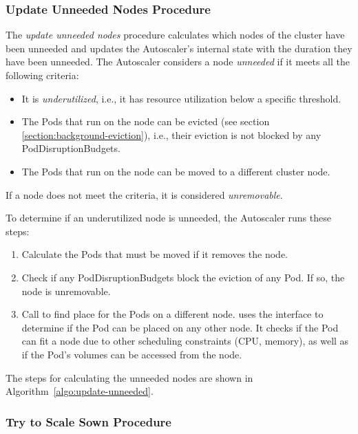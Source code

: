 \subsubsection{Update Unneeded Nodes Procedure}
The \textit{update unneeded nodes} procedure calculates which nodes of the
cluster have been unneeded and updates the Autoscaler's internal state with the
duration they have been unneeded. The Autoscaler considers a node
\textit{unneeded} if it meets all the following criteria:
\begin{itemize}
      \tightlist
      \item It is \textit{underutilized}, i.e., it has resource utilization
            below a specific threshold.
      \item The Pods that run on the node can be evicted (see section
            \ref{section:background-eviction}), i.e., their eviction is not
            blocked by any PodDisruptionBudgets.
      \item The Pods that run on the node can be moved to a different cluster
            node.
\end{itemize}
If a node does not meet the criteria, it is considered \textit{unremovable}.

To determine if an underutilized node is unneeded, the Autoscaler runs these
steps:
\begin{enumerate}
      \tightlist
      \item Calculate the Pods that must be moved if it removes the node.
      \item Check if any PodDisruptionBudgets block the eviction of any Pod. If
            so, the node is unremovable.
      \item Call  to find place for the Pods on a different
            node.  uses the
             interface to determine if the
            Pod can be placed on any other node. It checks if the Pod can fit a
            node due to other scheduling constraints (CPU, memory), as well as
            if the Pod's volumes can be accessed from the node.
\end{enumerate}


The steps for  calculating the unneeded nodes are shown in
Algorithm~\ref{algo:update-unneeded}.

\subsubsection{Try to Scale Sown Procedure}

